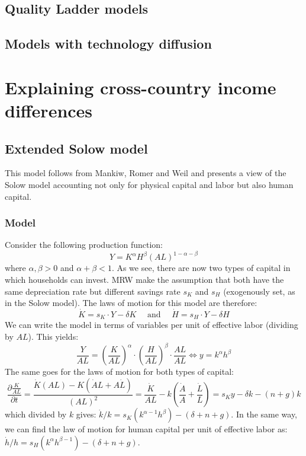 \documentclass[12pt]{report}
\begin{document}
\section{Quality Ladder models}



\section{Models with technology diffusion}

\chapter{Explaining cross-country income differences}

\section{Extended Solow model}

This model follows from Mankiw, Romer and Weil and presents a view of the Solow model accounting not only for physical capital and labor but also human capital.

\subsection{Model}

Consider the following production function: $$Y = K^\alpha H^\beta (AL)^{1-\alpha-\beta} $$ where $\alpha, \beta > 0$ and $\alpha + \beta < 1$. As we see, there are now two types of capital in which households can invest. MRW make the assumption that both have the same depreciation rate but different savings rate $s_K$ and $s_H$ (exogenously set, as in the Solow model). The laws of motion for this model are therefore: $$\dot K = s_K\cdot Y - \delta K\quad \text{ and } \quad \dot H = s_H\cdot Y - \delta H $$ We can write the model in terms of variables per unit of effective labor (dividing by $AL$). This yields: $$\frac{Y}{AL} = \left(\frac{K}{AL}\right)^\alpha\cdot \left(\frac{H}{AL}\right)^\beta \cdot \frac{AL}{AL} \Leftrightarrow y = k^\alpha h^\beta $$ The same goes for the laws of motion for both types of capital: $$\frac{\partial \frac{K}{AL}}{\partial t} = \frac{\dot K (AL) - K(\dot A L + A\dot L)}{(AL)^2} = \frac{\dot K}{AL} - k\left(\frac{\dot A}{A} + \frac{\dot L}{L}\right) = s_K y - \delta k - (n + g) k $$ which divided by $k$ gives: $\dot k/k = s_K(k^{\alpha - 1}h^\beta) - (\delta + n + g) $. In the same way, we can find the law of motion for human capital per unit of effective labor as: $\dot h/h = s_H(k^{\alpha}h^{\beta- 1}) - (\delta + n + g) $.
\end{document}
